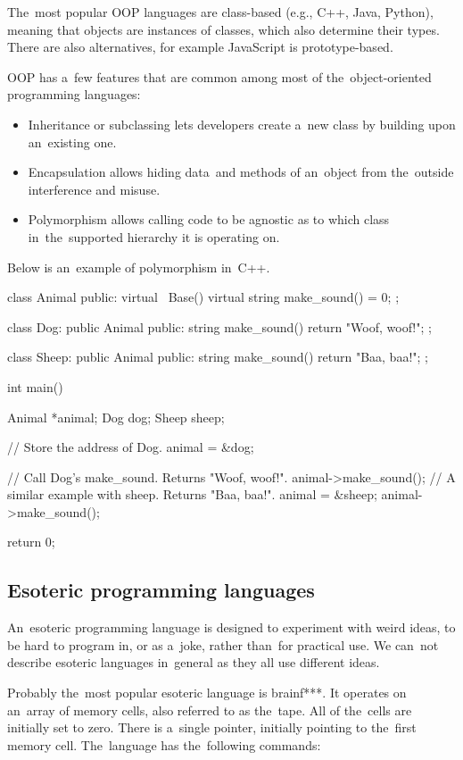 The~most popular OOP languages are class-based (e.g., C++, Java, Python), meaning that objects are instances of classes, which also determine their types.
There are also alternatives, for example JavaScript is prototype-based.

OOP has a~few features that are common among most of the~object-oriented programming languages:
\begin{itemize}
    \item Inheritance or subclassing lets developers create a~new class by building upon an~existing one.
    \item Encapsulation allows hiding data~and methods of an~object from the~outside interference and misuse.
    \item Polymorphism allows calling code to be agnostic as to which class in~the~supported hierarchy it is operating on.
\end{itemize}

Below is an~example of polymorphism in~C++.
\begin{code}
class Animal {
public:
    virtual ~Base() { }
    virtual string make_sound() = 0;
};

class Dog: public Animal {
public:
    string make_sound() { 
        return "Woof, woof!"; 
    }
};

class Sheep: public Animal {
public:
    string make_sound() { 
        return "Baa, baa!"; 
    }
};

int main() {
    Animal *animal;
    Dog dog;
    Sheep sheep;

    // Store the address of Dog.
    animal = &dog;

    // Call Dog's make_sound. Returns "Woof, woof!".
    animal->make_sound();
    // A similar example with sheep. Returns "Baa, baa!".
    animal = &sheep;
    animal->make_sound();

    return 0;
}
\end{code}

\subsection{Esoteric programming languages}
An~esoteric programming language is designed to experiment with weird ideas, to be hard to program in, or as a~joke, rather than~for practical use. We can~not
describe esoteric languages in~general as they all use different ideas.

Probably the~most popular esoteric language is brainf***. It operates on an~array of memory cells, also referred to as the~tape. All of the~cells are initially
set to zero. There is a~single pointer, initially pointing to the~first memory cell. The~language has the~following commands:

